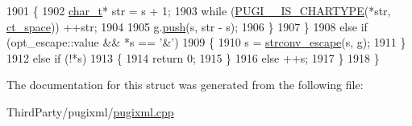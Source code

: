 \begin{DoxyCode}
1901                     \{
1902                         \hyperlink{namespacepugi_aef5a7a62cba0507542220ea15afe39df}{char\_t}* str = s + 1;
1903                         \textcolor{keywordflow}{while} (\hyperlink{pugixml_8cpp_a2adf5ae9b7505408a18e9f3bb1b3d332}{PUGI\_\_IS\_CHARTYPE}(*str, \hyperlink{pugixml_8cpp_ae83a55e5947d28c62625b690b1484108ac957a1774b6a4430e583bcb881909372}{ct\_space})) ++str;
1904                         
1905                         g.\hyperlink{structgap_a9c0d0b12bc778c8439c8aec7747ab2b0}{push}(s, str - s);
1906                     \}
1907                 \}
1908                 \textcolor{keywordflow}{else} \textcolor{keywordflow}{if} (opt\_escape::value && *s == \textcolor{charliteral}{'&'})
1909                 \{
1910                     s = \hyperlink{pugixml_8cpp_a7cf2b6da7b109a11f8cb1c7e1a09bf7e}{strconv\_escape}(s, g);
1911                 \}
1912                 \textcolor{keywordflow}{else} \textcolor{keywordflow}{if} (!*s)
1913                 \{
1914                     \textcolor{keywordflow}{return} 0;
1915                 \}
1916                 \textcolor{keywordflow}{else} ++s;
1917             \}
1918         \}
\end{DoxyCode}


The documentation for this struct was generated from the following file\-:\begin{DoxyCompactItemize}
\item 
Third\-Party/pugixml/\hyperlink{pugixml_8cpp}{pugixml.\-cpp}\end{DoxyCompactItemize}
